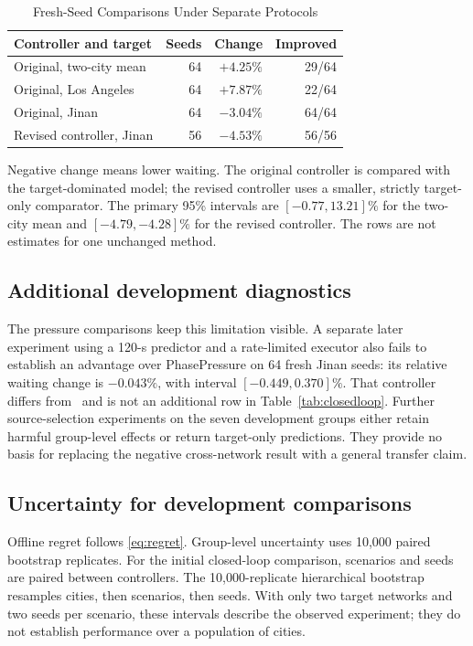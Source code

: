 \begin{table}[!t]
\caption{Fresh-Seed Comparisons Under Separate Protocols}
\label{tab:fresh}
\centering
\begin{tabular}{lrrr}
\toprule
Controller and target & Seeds & Change & Improved\\
\midrule
Original, two-city mean & 64 & $+4.25\%$ & 29/64\\
Original, Los Angeles & 64 & $+7.87\%$ & 22/64\\
Original, Jinan & 64 & $-3.04\%$ & 64/64\\
Revised controller, Jinan & 56 & $-4.53\%$ & 56/56\\
\bottomrule
\end{tabular}
\vspace{3pt}
\begin{minipage}{\columnwidth}\footnotesize
Negative change means lower waiting. The original controller is compared with the target-dominated model; the revised controller uses a smaller, strictly target-only comparator. The primary 95\% intervals are $[-0.77,13.21]\%$ for the two-city mean and $[-4.79,-4.28]\%$ for the revised controller. The rows are not estimates for one unchanged method.
\end{minipage}
\end{table}

\subsection{Additional development diagnostics}
The pressure comparisons keep this limitation visible. A separate later experiment using a 120-s predictor and a rate-limited executor also fails to establish an advantage over PhasePressure on 64 fresh Jinan seeds: its relative waiting change is $-0.043\%$, with interval $[-0.449,0.370]\%$. That controller differs from \method\ and is not an additional row in Table~\ref{tab:closedloop}. Further source-selection experiments on the seven development groups either retain harmful group-level effects or return target-only predictions. They provide no basis for replacing the negative cross-network result with a general transfer claim.


\subsection{Uncertainty for development comparisons}
Offline regret follows \eqref{eq:regret}. Group-level uncertainty uses 10,000 paired bootstrap replicates. For the initial closed-loop comparison, scenarios and seeds are paired between controllers. The 10,000-replicate hierarchical bootstrap resamples cities, then scenarios, then seeds. With only two target networks and two seeds per scenario, these intervals describe the observed experiment; they do not establish performance over a population of cities.

